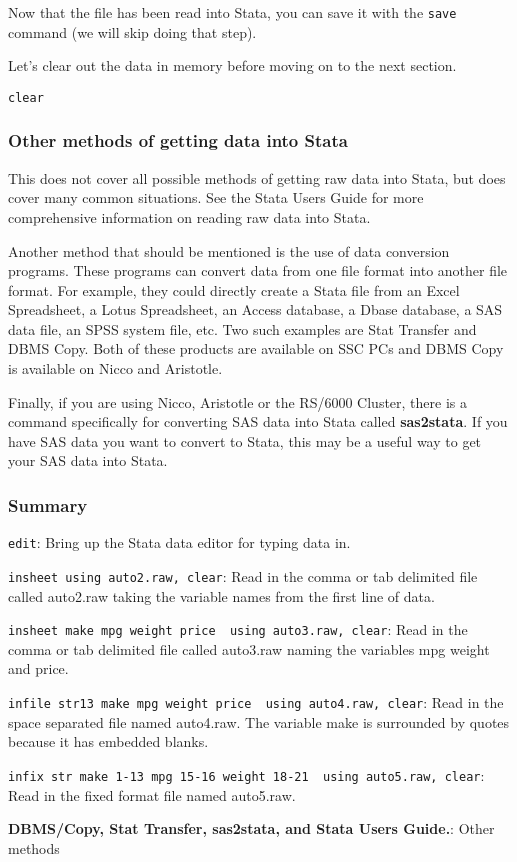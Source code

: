 Now that the file has been read into Stata, you can save it with the \lstinline{save} command (we will skip doing that step).

Let's clear out the data in memory before moving on to the next section.

\begin{lstlisting}
clear
\end{lstlisting}

\subsubsection{Other methods of getting data into Stata}

This does not cover all possible methods of getting raw data into Stata, but does cover many common situations. See the Stata Users Guide for more comprehensive information on reading raw data into Stata.

Another method that should be mentioned is the use of data conversion programs. These programs can convert data from one file format into another file format. For example, they could directly create a Stata file from an Excel Spreadsheet, a Lotus Spreadsheet, an Access database, a Dbase database, a SAS data file, an SPSS system file, etc. Two such examples are Stat Transfer and DBMS Copy. Both of these products are available on SSC PCs and DBMS Copy is available on Nicco and Aristotle.

Finally, if you are using Nicco, Aristotle or the RS/6000 Cluster, there is a command specifically for converting SAS data into Stata called \textbf{sas2stata}. If you have SAS data you want to convert to Stata, this may be a useful way to get your SAS data into Stata.

\subsubsection{Summary}

\begin{compactitem}
\item \lstinline{edit}: Bring up the Stata data editor for typing data in.
\item \lstinline{insheet using auto2.raw, clear}: Read in the comma or tab delimited file called auto2.raw taking the variable names from the first line of data.
\item \lstinline{insheet make mpg weight price  using auto3.raw, clear}: Read in the comma or tab delimited file called auto3.raw naming the variables mpg weight and price.
\item \lstinline{infile str13 make mpg weight price  using auto4.raw, clear}: Read in the space separated file named auto4.raw. The variable make is surrounded by quotes because it has embedded blanks.
\item \lstinline{infix str make 1-13 mpg 15-16 weight 18-21  using auto5.raw, clear}: Read in the fixed format file named auto5.raw.
\item \textbf{DBMS/Copy, Stat Transfer, sas2stata, and  Stata Users Guide.}: Other methods
\end{compactitem}

